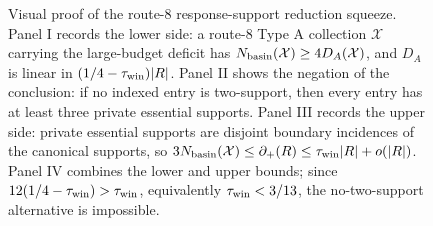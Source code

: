 \documentclass[11pt]{article}
\newcommand{\defp}{\partial_+}
\begin{document}
\begin{figure}[t]
{%
}
\caption[Visual proof of the route-8 response-support reduction squeeze]{Visual proof of the route-8 response-support reduction squeeze.  Panel I records the lower side: a route-8 Type A collection \(\mathcal X\) carrying the large-budget deficit has \(N_{\rm basin}(\mathcal X)\ge4D_A(\mathcal X)\), and \(D_A\) is linear in \((1/4-\tau_{\rm win})|R|\).  Panel II shows the negation of the conclusion: if no indexed entry is two-support, then every entry has at least three private essential supports.  Panel III records the upper side: private essential supports are disjoint boundary incidences of the canonical supports, so \(3N_{\rm basin}(\mathcal X)\le\defp(R)\le\tau_{\rm win}|R|+o(|R|)\).  Panel IV combines the lower and upper bounds; since \(12(1/4-\tau_{\rm win})>\tau_{\rm win}\), equivalently \(\tau_{\rm win}<3/13\), the no-two-support alternative is impossible.}
\label{fig:typeA-route8-carrier-reduction-squeeze}
\end{figure}
\end{document}
